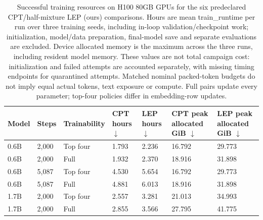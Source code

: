 \begin{table}[t]
\centering
\small
\setlength{\tabcolsep}{4pt}
\begin{tabular}{@{}lllllll@{}}
\toprule
Model & Steps & Trainability & CPT hours $\downarrow$ & LEP hours $\downarrow$ & \shortstack{CPT peak\\allocated GiB $\downarrow$} & \shortstack{LEP peak\\allocated GiB $\downarrow$} \\
\midrule
0.6B & 2,000 & Top four & 1.793 & 2.236 & 16.792 & 29.773 \\
0.6B & 2,000 & Full & 1.932 & 2.370 & 18.916 & 31.898 \\
0.6B & 5,087 & Top four & 4.530 & 5.654 & 16.792 & 29.773 \\
0.6B & 5,087 & Full & 4.881 & 6.013 & 18.916 & 31.898 \\
1.7B & 2,000 & Top four & 2.557 & 3.281 & 21.013 & 34.993 \\
1.7B & 2,000 & Full & 2.855 & 3.566 & 27.795 & 41.775 \\
\bottomrule
\end{tabular}
\caption{Successful training resources on H100 80GB GPUs for the six predeclared CPT/half-mixture LEP (ours) comparisons. Hours are mean train\_runtime per run over three training seeds, including in-loop validation/checkpoint work; initialization, model/data preparation, final-model save and separate evaluations are excluded. Device allocated memory is the maximum across the three runs, including resident model memory. These values are not total campaign cost: initialization and failed attempts are accounted separately, with missing timing endpoints for quarantined attempts. Matched nominal packed-token budgets do not imply equal actual tokens, text exposure or compute. Full pairs update every parameter; top-four policies differ in embedding-row updates.}
\label{tab:rebuttal-training-resources}
\end{table}
